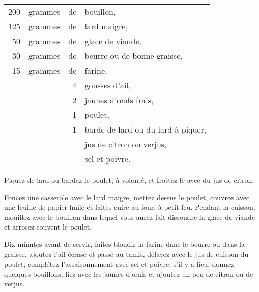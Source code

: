 \medskip

\footnotesize
\begin{longtable}{rrrp{16em}}
    200 & grammes & de & bouillon,                                                                        \\
    125 & grammes & de & lard maigre,                                                                     \\
     50 & grammes & de & glace de viande,                                                                 \\
     30 & grammes & de & beurre ou de bonne graisse,                                                      \\
     15 & grammes & de & farine,                                                                          \\
        &         &  4 & gousses d'ail,                                                                   \\
        &         &  2 & jaunes d'œufs frais,                                                             \\
        &         &  1 & poulet,                                                                          \\
        &         &  1 & barde de lard ou du lard à piquer,                                               \\
        &         &    & jus de citron ou verjus,                                                         \\
        &         &    & sel et poivre.                                                                   \\
\end{longtable}
\normalsize

Piquez de lard ou bardez le poulet, à volonté, et frottez-le avec du jus de citron.

Foncez une casserole avec le lard maigre, mettez dessus le poulet, couvrez avec
une feuille de papier huilé et faites cuire au four, à petit feu. Pendant la
cuisson, mouillez avec le bouillon dans lequel vous aurez fait dissoudre la
glace de viande et arrosez souvent le poulet.

Dix minutes avant de servir, faites blondir la farine dans le beurre ou dans la
graisse, ajoutez l'ail écrasé et passé au tamis, délayez avec le jus de cuisson
du poulet, complétez l’assaisonnement avec sel et poivre, s'il y a lieu, donnez
quelques bouillons, liez avec les jaunes d'œufs et ajoutez un peu de citron ou
de verjus.

